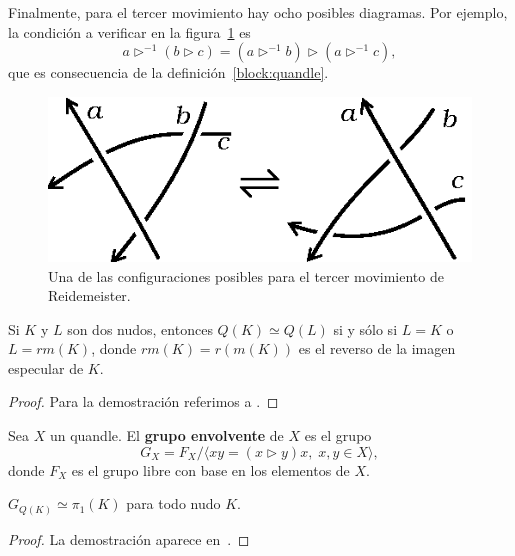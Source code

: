\documentclass[graybox]{svmult}
\begin{document}
	Finalmente, para el tercer movimiento hay ocho posibles diagramas. Por
	ejemplo, la condición a verificar en la figura~\ref{fig:oriented_R3a} es
    \begin{equation*}
        a\triangleright^{-1}(b\triangleright c)=(a\triangleright^{-1}b)\triangleright(a\triangleright^{-1}c),
    \end{equation*}
    que es consecuencia de la definición~\ref{block:quandle}.

    \begin{figure}[h]
		\centering
        \includegraphics[scale=0.6]{images/oriented_R3a}
        \caption{Una de las configuraciones posibles para el tercer movimiento de Reidemeister.}
        \label{fig:oriented_R3a}
    \end{figure}

	\begin{theorem}[Matveev]
		Si $K$ y $L$ son dos nudos, entonces 
		$Q(K)\simeq Q(L)$ si y sólo si $L=K$ o $L=rm(K)$, donde $rm(K)=r(m(K))$ es el reverso de la imagen
		especular de $K$.
	\end{theorem}

	\begin{proof}
	Para la demostración referimos a \cite{MR672410}.
	\end{proof}

	Sea $X$ un quandle. El \textbf{grupo envolvente} de $X$ es el grupo
	\[
		G_X=F_X/\langle xy=(x\triangleright y)x,\;x,y\in X\rangle,
	\]
	donde $F_X$ es el grupo libre con base en los elementos de $X$.

	\begin{theorem}[Joyce]
		$G_{Q(K)}\simeq\pi_1(K)$ para todo nudo $K$. 
	\end{theorem}

	\begin{proof}
		La demostración aparece en~\cite{MR638121}.
	\end{proof}
\end{document}
